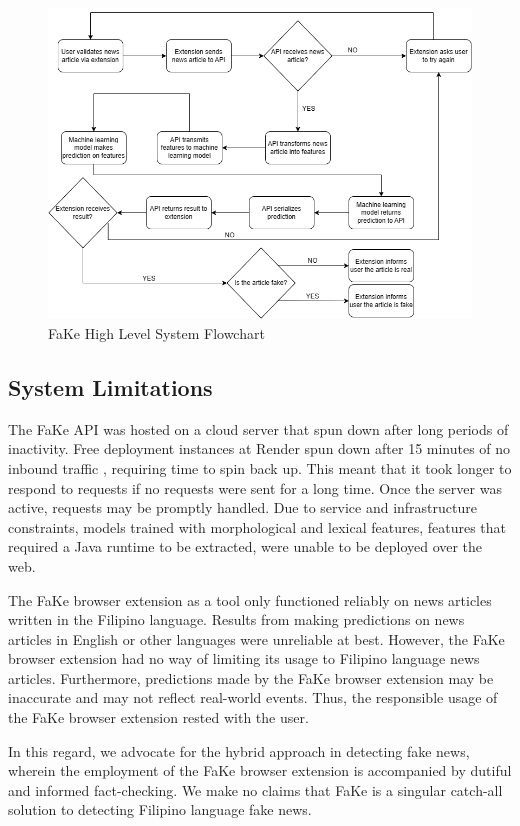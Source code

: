 \begin{figure}[h]
\includegraphics[width=\textwidth,height=\textheight,keepaspectratio]{figures/FakeSystemFlowchart.png}
  \caption{FaKe High Level System Flowchart}
  \label{SystemFlowchart}
\end{figure}
\clearpage

\subsection{System Limitations} \label{extension-limitations}

The FaKe API was hosted on a cloud server that spun down after long periods of inactivity. Free deployment instances at Render spun down after 15 minutes of no inbound traffic \cite{render-docs}, requiring time to spin back up. This meant that it took longer to respond to requests if no requests were sent for a long time. Once the server was active, requests may be promptly handled. Due to service and infrastructure constraints, models trained with morphological and lexical features, features that required a Java runtime to be extracted, were unable to be deployed over the web.

The FaKe browser extension as a tool only functioned reliably on news articles written in the Filipino language. Results from making predictions on news articles in English or other languages were unreliable at best. However, the FaKe browser extension had no way of limiting its usage to Filipino language news articles. Furthermore, predictions made by the FaKe browser extension may be inaccurate and may not reflect real-world events. Thus, the responsible usage of the FaKe browser extension rested with the user.

In this regard, we advocate for the hybrid approach in detecting fake news, wherein the employment of the FaKe browser extension is accompanied by dutiful and informed fact-checking. We make no claims that FaKe is a singular catch-all solution to detecting Filipino language fake news.